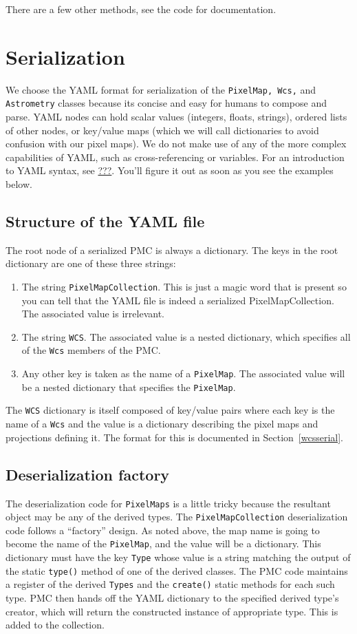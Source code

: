 \documentclass[11pt,preprint,flushrt]{aastex}
\begin{document}
There are a few other methods, see the code for documentation.

\section{Serialization}
\label{serialize}
We choose the YAML format for serialization of the \texttt{PixelMap, Wcs,} and \texttt{Astrometry} classes because its concise and easy for humans to compose and parse.  YAML nodes can hold scalar values (integers, floats, strings), ordered lists of other nodes, or key/value maps (which we will call dictionaries to avoid confusion with our pixel maps).  We do not make use of any of the more complex capabilities of YAML, such as cross-referencing or variables.  For an introduction to YAML syntax, see \url{???}.  You'll figure it out as soon as you see the examples below.

\subsection{Structure of the YAML file}
The root node of a serialized PMC is always a dictionary.  The keys in the root dictionary are one of these three strings:
\begin{enumerate}
\item The string \texttt{PixelMapCollection}.  This is just a magic word that is present so you can tell that the YAML file is indeed a serialized PixelMapCollection.  The associated value is irrelevant.
\item The string \texttt{WCS}.  The associated value is a nested dictionary, which specifies all of the \texttt{Wcs} members of the PMC.
\item Any other key is taken as the name of a \texttt{PixelMap}.  The associated value will be a nested dictionary that specifies the \texttt{PixelMap}.
\end{enumerate}

The \texttt{WCS} dictionary is itself composed of key/value pairs where each key is the name of a \texttt{Wcs}  and the value is a dictionary describing the pixel maps and projections defining it.  The format for this is documented in Section~\ref{wcsserial}.

\subsection{Deserialization factory}
The deserialization code for \texttt{PixelMaps} is a little tricky because the resultant object may be any of the derived types.  The \texttt{PixelMapCollection} deserialization code follows a ``factory'' design.  As noted above, the map name is going to become the name of the \texttt{PixelMap}, and the value will be a dictionary.  This dictionary must have the key \texttt{Type} whose value is a string matching the output of the static \texttt{type()} method of one of the derived classes.  The PMC code maintains a register of the derived \texttt{Types} and the \texttt{create()} static methods for each such type.  PMC then hands off the YAML dictionary to the specified derived type's creator, which will return the constructed instance of appropriate type.  This is added to the collection.
\end{document}
